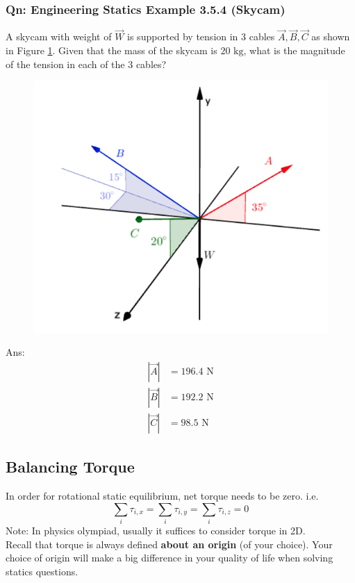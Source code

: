 \documentclass{article}
\begin{document}
\subsubsection{Qn: Engineering Statics Example 3.5.4 (Skycam)}
A skycam with weight of $\vec{W}$ is supported by tension in 3 cables $\vec{A}, \vec{B}, \vec{C}$ as shown in Figure \ref{fig:staticsskycam}. Given that the mass of the skycam is $20\text{ kg}$, what is the magnitude of the tension in each of the 3 cables? \\
\begin{figure} 
\includegraphics[width=\linewidth]{images/staticsskycam.png}
\label{fig:staticsskycam}
\end{figure}
Ans: \begin{align*}
    |\vec{A}| &= 196.4 \text{ N} \\ 
    |\vec{B}| &= 192.2 \text{ N} \\ 
    |\vec{C}| &= 98.5 \text{ N} 
\end{align*}
\clearpage
\subsection{Balancing Torque}
In order for rotational static equilibrium, net torque needs to be zero. i.e. 
$$\sum_i \tau_{i,x} = \sum_i \tau_{i,y} = \sum_i \tau_{i,z} = 0$$
Note: In physics olympiad, usually it suffices to consider torque in 2D. \\[10pt]
Recall that torque is always defined \textbf{about an origin} (of your choice). Your choice of origin will make a big difference in your quality of life when solving statics questions.
\end{document}

